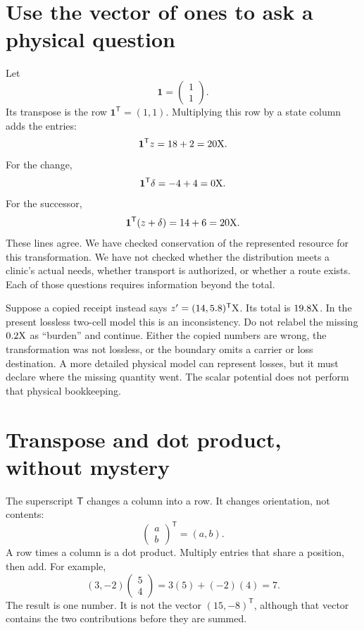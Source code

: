 \section{Use the vector of ones to ask a physical question}

Let
\begin{equation}
\mathbf 1=\begin{pmatrix}1\\1\end{pmatrix}.
\end{equation}
Its transpose is the row \(\mathbf 1^{\mathsf T}=(1,1)\). Multiplying this row by a state column adds the entries:
\begin{equation}
\mathbf 1^{\mathsf T}z=18+2=20\mathrm{X}.
\end{equation}
For the change,
\begin{equation}
\mathbf 1^{\mathsf T}\delta=-4+4=0\mathrm{X}.
\end{equation}
For the successor,
\begin{equation}
\mathbf 1^{\mathsf T}(z+\delta)=14+6=20\mathrm{X}.
\end{equation}
These lines agree. We have checked conservation of the represented resource for this transformation. We have not checked whether the distribution meets a clinic's actual needs, whether transport is authorized, or whether a route exists. Each of those questions requires information beyond the total.

Suppose a copied receipt instead says \(z'=(14,5.8)^{\mathsf T}\mathrm{X}\). Its total is \(19.8\mathrm{X}\). In the present lossless two-cell model this is an inconsistency. Do not relabel the missing \(0.2\mathrm{X}\) as ``burden'' and continue. Either the copied numbers are wrong, the transformation was not lossless, or the boundary omits a carrier or loss destination. A more detailed physical model can represent losses, but it must declare where the missing quantity went. The scalar potential does not perform that physical bookkeeping.

\section{Transpose and dot product, without mystery}

The superscript \(\mathsf T\) changes a column into a row. It changes orientation, not contents:
\begin{equation}
\begin{pmatrix}a\\b\end{pmatrix}^{\mathsf T}=(a,b).
\end{equation}
A row times a column is a dot product. Multiply entries that share a position, then add. For example,
\begin{equation}
(3,-2)\begin{pmatrix}5\\4\end{pmatrix}=3(5)+(-2)(4)=7.
\end{equation}
The result is one number. It is not the vector \((15,-8)^{\mathsf T}\), although that vector contains the two contributions before they are summed.

